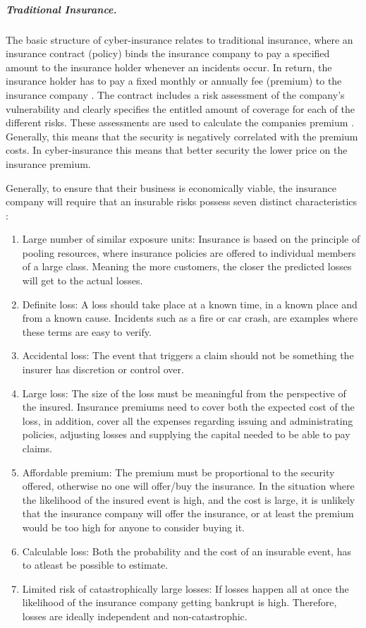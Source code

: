 \subparagraph{Traditional Insurance.} 
The basic structure of cyber-insurance relates to traditional insurance, where an insurance contract (policy) binds the insurance company to pay a specified amount to the insurance holder whenever an incidents occur. In return, the insurance holder has to pay a fixed monthly or annually fee (premium) to the insurance company \cite{robinson2012incentives}. The contract includes a risk assessment of the company's vulnerability and clearly specifies the entitled amount of coverage for each of the different risks. These assessments are used to calculate the companies premium \cite{robinson2012incentives}. Generally, this means that the security is negatively correlated with the premium costs. In cyber-insurance this means that better security the lower price on the insurance premium.
   
Generally, to ensure that their business is economically viable, the insurance company will require that an insurable risks possess seven distinct characteristics \cite{mehr1980principles}: 
   \begin{enumerate}
   \item Large number of similar exposure units: Insurance is based on the principle of pooling resources, where insurance policies are offered to individual members of a large class. Meaning the more customers, the closer the predicted losses will get to the actual losses.
   \item Definite loss: A loss should take place at a known time, in a known place and from a known
    cause. Incidents such as a fire or car crash, are examples where these terms are easy to verify.
   \item Accidental loss: The event that triggers a claim should not be 
   something the insurer has discretion or control over.
   \item Large loss: The size of the loss must be meaningful from the perspective of the insured.
    Insurance premiums need to cover both the expected cost of the loss, in addition, 
    cover all the expenses regarding issuing and administrating policies, adjusting losses and
     supplying the capital needed to be able to pay claims.
   \item Affordable premium: The premium must be proportional to the security offered, otherwise no
    one will offer/buy the insurance. In the situation where the likelihood of the insured event is
     high, and the cost is large, it is unlikely that the insurance company will offer the insurance,
      or at least the premium would be too high for anyone to consider buying it. 
   \item Calculable loss: Both the probability and the cost of an insurable event,
    has to atleast be possible to estimate. 
   \item Limited risk of catastrophically large losses: If losses happen all at once the likelihood of
    the insurance company getting bankrupt is high. Therefore, losses are ideally independent and non-catastrophic. 
   \end{enumerate}
   
